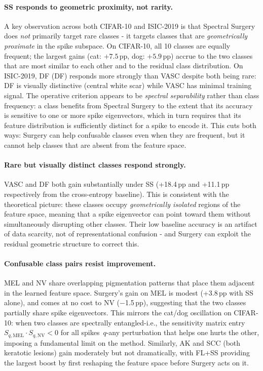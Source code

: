 \documentclass[11pt,a4paper]{article}
\begin{document}
\paragraph{SS responds to geometric proximity, not rarity.}
A key observation across both CIFAR-10 and ISIC-2019 is that Spectral
Surgery does \emph{not} primarily target rare classes - it targets
classes that are \emph{geometrically proximate} in the spike subspace.
On CIFAR-10, all 10 classes are equally frequent; the largest gains
(cat: $+7.5$\,pp, dog: $+5.9$\,pp) accrue to the two classes that are
most similar to each other and to the residual class distribution.
On ISIC-2019, DF (DF) responds more strongly than VASC despite both
being rare: DF is visually distinctive (central white scar) while VASC
has minimal training signal. The operative criterion appears to be \emph{spectral separability}
rather than class frequency: a class benefits from Spectral Surgery to the
extent that its accuracy is sensitive to one or more spike
eigenvectors, which in turn requires that its feature distribution is
sufficiently distinct for a spike to encode it.
This cuts both ways: Surgery can help confusable classes even when they
are frequent, but it cannot help classes that are absent from the
feature space.

\paragraph{Rare but visually distinct classes respond strongly.}
VASC and DF both gain substantially under SS (+18.4\,pp and
+11.1\,pp respectively from the cross-entropy baseline). This is
consistent with the theoretical picture: these classes occupy
\emph{geometrically isolated} regions of the feature space, meaning
that a spike eigenvector can point toward them without simultaneously
disrupting other classes. Their low baseline accuracy is an artifact of
data scarcity, not of representational confusion - and Surgery can
exploit the residual geometric structure to correct this.

\paragraph{Confusable class pairs resist improvement.}
MEL and NV share overlapping pigmentation patterns that place them
adjacent in the learned feature space. Surgery's gain on MEL is modest
(+3.8\,pp with SS alone), and comes at no cost to NV ($-$1.5\,pp),
suggesting that the two classes partially share spike eigenvectors.
This mirrors the cat/dog oscillation on CIFAR-10: when two classes
are spectrally entangled-i.e., the sensitivity matrix entry
$S_{q,\text{MEL}} \cdot S_{q,\text{NV}} < 0$ for all spikes~$q$-any
perturbation that helps one hurts the other, imposing a fundamental
limit on the method. Similarly, AK and SCC (both keratotic lesions)
gain moderately but not dramatically, with FL+SS providing the largest
boost by first reshaping the feature space before Surgery acts on it.
\end{document}
